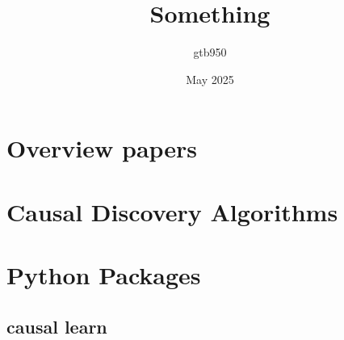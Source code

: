 \documentclass{article}
\title{Something}
\author{gtb950 }
\date{May 2025}
\begin{document}
\maketitle

\section{Overview papers}

\section{Causal Discovery Algorithms}
\section{Python Packages}
\subsection{causal learn}
\end{document}
